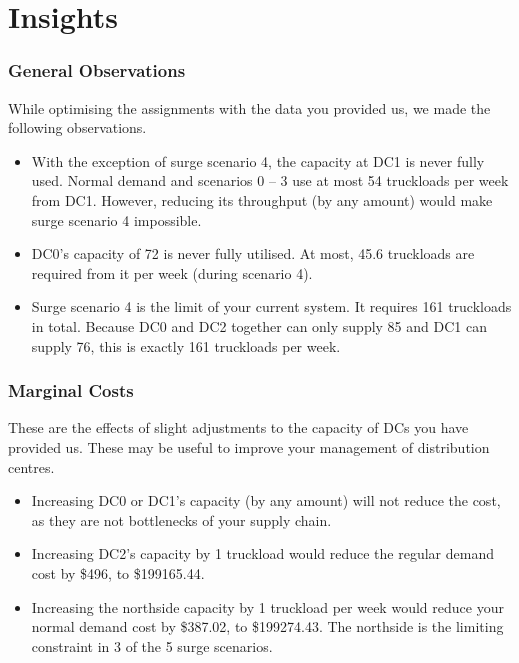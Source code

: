 \documentclass[11pt,a4paper]{article}
\begin{document}
\part{Insights}
\section{General Observations}
While optimising the assignments with the data you provided us, we made 
the following observations.
\begin{itemize}
    \item With the exception of surge scenario 4, the capacity at DC1 is never 
fully used. Normal demand and scenarios 0 -- 3 use at most 54 truckloads per week 
from DC1. However, reducing its throughput (by any amount) would make surge scenario 4
impossible.
    \item DC0's capacity of 72 is never fully utilised. At most, 45.6 truckloads are 
    required from it per week (during scenario 4).
    \item Surge scenario 4 is the limit of your current system. It requires 161 truckloads 
    in total. Because DC0 and DC2 together can only supply 85 and DC1 can supply 76, this is 
    exactly 161 truckloads per week. 
\end{itemize}

\section{Marginal Costs}
These are the effects of slight adjustments to the capacity of DCs 
 you have provided us. These may be useful to improve your management of 
 distribution centres. 
\begin{itemize}
    \item Increasing DC0 or DC1's capacity 
    (by any amount) will not reduce the cost, as they are not bottlenecks of your supply chain.
    \item Increasing DC2's capacity by 1 truckload would 
    reduce the regular demand cost by \$496, to \$199165.44.
    \item Increasing the northside capacity by 1 truckload per week would reduce your
    normal demand cost by \$387.02, to \$199274.43. The northside is the limiting 
    constraint in 3 of the 5 surge scenarios.
\end{itemize}
\end{document}
